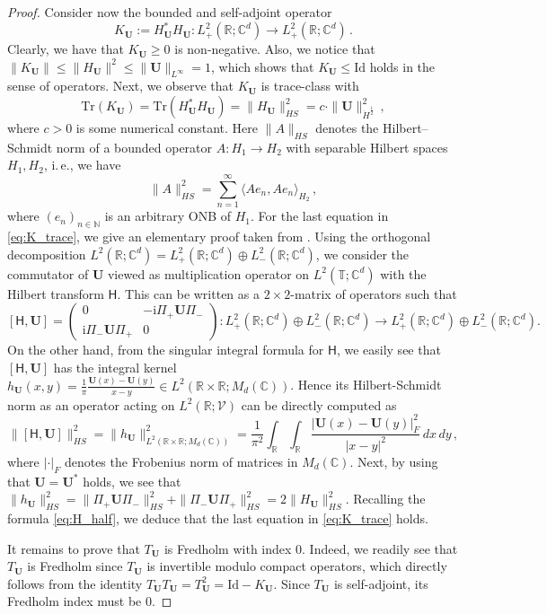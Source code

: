 \documentclass[11pt,reqno]{amsart}
\theoremstyle{definition}
\theoremstyle{remark}
\theoremstyle{remark}
\numberwithin{equation}{section}
\newcommand{\C}{\mathbb{C}}
\newcommand{\N}{\mathbb{N}}
\newcommand{\R}{\mathbb{R}}
\newcommand{\T}{\mathbb{T}}
\newcommand{\VV}{\mathcal{V}}
\newcommand{\be}{\begin{equation}}
\newcommand{\ee}{\end{equation}}
\newcommand{\ii}{\mathrm{i}}
\newcommand{\Hil}{\mathsf{H}}
\newcommand{\Ub}{\mathbf{U}}
\newcommand{\id}{\mathrm{Id}}
\newcommand{\Tr}{\mathrm{Tr}}
\begin{document}
\begin{proof}
Consider now the bounded and  self-adjoint operator 
$$
K_{\Ub} := H_{\Ub}^* H_{\Ub} : L^2_+(\R; \C^d) \to L^2_+(\R; \C^d) \, .
$$ 
Clearly, we have that $K_{\Ub} \geq 0$ is non-negative. Also, we notice that $\| K_{\Ub} \| \leq \| H_{\Ub} \|^2 \leq \| \Ub \|_{L^\infty} = 1$, which shows that $K_{\Ub} \leq \id$ holds in the sense of operators. Next, we observe that $K_{\Ub}$ is trace-class with
\be \label{eq:K_trace}
\Tr(K_{\Ub}) = \Tr(H_\Ub^* H_\Ub) = \| H_{\Ub} \|_{HS}^2 = c  \cdot \| \Ub \|_{\dot{H}^{\frac 1 2}}^2 \, ,
\ee 
where $c>0$ is some numerical constant. Here $\| A \|_{HS}$ denotes the Hilbert--Schmidt norm of a bounded operator $A : H_1 \to H_2$ with separable Hilbert spaces $H_1, H_2$, i.\,e., we have 
$$
\| A \|_{HS}^2  = \sum_{n=1}^\infty \langle  A e_n, A e_n \rangle_{H_2} \, ,
$$  
where $(e_n)_{n \in \N}$ is an arbitrary ONB of $H_1$. For the last equation in \eqref{eq:K_trace}, we give an elementary proof taken from \cite{GeLe-18}. Using the orthogonal decomposition $L^2(\R;\C^d) = L^2_+(\R; \C^d) \oplus L^2_-(\R; \C^d)$, we consider the commutator of $\Ub$ viewed as multiplication operator on $L^2(\T; \C^d)$ with the Hilbert transform $\Hil$. This can be written as a $2 \times 2$-matrix of operators such that
$$
 [\Hil, \Ub] = \left ( \begin{array}{cc} 0 & -\ii \Pi_+ \Ub \Pi_- \\ \ii \Pi_- \Ub \Pi_+ & 0 \end{array} \right ) : L^2_+(\R; \C^d) \oplus L^2_-(\R; \C^d) \to L^2_+(\R; \C^d) \oplus L^2_-(\R;\C^d).
$$
On the other hand, from the singular integral formula for $\Hil$, we easily see that $[\Hil, \Ub]$ has the integral kernel $h_\Ub(x,y) = \frac{1}{\pi} \frac{\Ub(x)-\Ub(y)}{x-y} \in L^2(\R \times \R; M_d(\C))$. Hence its Hilbert-Schmidt norm as an operator acting on $L^2(\R; \VV)$ can be directly computed as
$$
\| [\Hil, \Ub] \|_{HS}^2 = \| h_\Ub \|_{L^2(\R \times \R; M_d(\C))}^2 = \frac{1}{\pi^2} \int_{\R} \! \int_{\R} \frac{|\Ub(x)- \Ub(y)|_F^2}{|x-y|^2} \, dx \,dy \, ,
$$
where $| \cdot |_F$ denotes the Frobenius norm of matrices in $M_d(\C)$. Next, by using that $\Ub= \Ub^*$ holds, we see that $\| h_\Ub \|_{HS}^2 = \| \Pi_+ \Ub \Pi_- \|_{HS}^2 + \| \Pi_- \Ub \Pi_+ \|_{HS}^2 =2 \| H_\Ub \|_{HS}^2$. Recalling the formula \eqref{eq:H_half}, we deduce that the last equation in \eqref{eq:K_trace} holds.

It remains to prove that $T_{\Ub}$ is Fredholm with index 0. Indeed, we readily see that $T_\Ub$ is Fredholm since $T_\Ub$ is invertible modulo compact operators, which directly follows from the identity $T_{\Ub} T_\Ub = T_\Ub^2 = \id - K_\Ub$. Since $T_{\Ub}$ is self-adjoint, its Fredholm index must be 0.
\end{proof}
\end{document}
